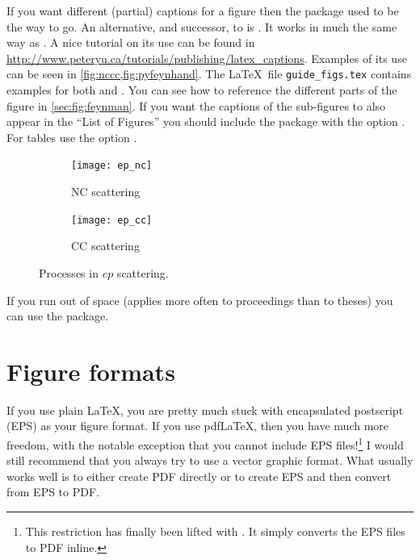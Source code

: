 If you want different (partial) captions for a figure then the
 package used to be the way to go. 
An alternative, and successor, to  is .
It works in much the same way as .
A nice tutorial on its use can be found in
\url{http://www.peteryu.ca/tutorials/publishing/latex_captions}.
Examples of its use can be seen in \cref{fig:nccc,fig:pyfeynhand}.
The \LaTeX\ file \texttt{guide\_figs.tex} contains examples for both  and 
.
You can see how to reference
the different parts of the figure in \cref{sec:fig:feynman}. If
you want the captions of the sub-figures to also appear in the
\enquote{List of Figures} you should include the package with the
option . For tables use the option .

\begin{figure}[htbp]
  \begin{tcblisting}{}
  \centering
  \begin{subfigure}[b]{0.5\figwidth}
    \texttt{[image: ep\_nc]}
    \caption{NC scattering}\label{fig:nccc-nc}
  \end{subfigure}
  \qquad
  \begin{subfigure}[b]{0.5\figwidth}
    \texttt{[image: ep\_cc]}
    \caption{CC scattering}\label{fig:nccc-cc}
  \end{subfigure}
  \end{tcblisting}
  \caption{Processes in $ep$ scattering.}%
  \label{fig:nccc}
\end{figure}

If you run out of space (applies more often to proceedings than to
theses) you can use the  package.


\section{Figure formats}%
\label{sec:fig:formats}

If you use plain \LaTeX, you are pretty much stuck with encapsulated
postscript (EPS) as your figure format. If you use pdf\LaTeX, then you
have much more freedom, with the notable exception that you cannot
include EPS files!\footnote{%
This restriction has finally been lifted with .
It simply converts the EPS files to PDF inline.}
I would still recommend that you always try to use
a vector graphic format. What usually works well is to either create
PDF directly or to create EPS and then convert from EPS to PDF\@.


